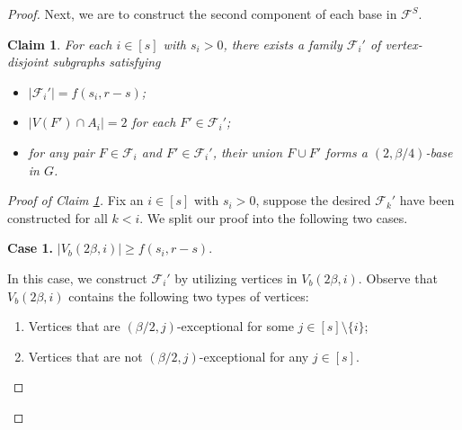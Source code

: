 \documentclass[11pt, a4paper]{article}
\newtheorem{claim}[theorem]{Claim}
\theoremstyle{definition}
\newcommand{\<}{\subseteq}
\begin{document}
\begin{proof}
Next, we are to construct the second component of each base in $\mathcal{F}^S$. 
\begin{claim}\label{com-2}
    For each $i\in [s]$ with $s_i>0$, there exists a family $\mathcal{F}_i'$ of vertex-disjoint subgraphs satisfying
    \begin{itemize}
        \item $|\mathcal{F}_i'|=f(s_i,r-s)$;
        \item $|V(F') \cap A_i|=2$ for each $F'\in \mathcal{F}_i'$;
        \item for any pair  $F\in \mathcal{F}_i$ and 
        $F'\in \mathcal{F}_i'$, their union $F\cup F'$ forms a $(2,\beta/4)$-base in $G$. 
    \end{itemize}
\end{claim}

\begin{proof}[Proof of Claim \ref{com-2}]
Fix an $i\in [s]$ with $s_i>0$,  suppose the desired $\mathcal{F}_k'$ have been constructed for all $k < i$. We split our proof into the following two cases. %



\medskip
\textbf{Case 1.} $|V_b(2\beta,i)|\ge f(s_i,r-s)$.
\medskip

In this case, we construct $\mathcal{F}_i'$ by utilizing vertices in  $V_{b}(2\beta,i)$. Observe that $V_{b}(2\beta, i)$ contains the following two types of vertices:
\begin{enumerate}[label =\rm  {\bf Type \arabic{enumi}}, leftmargin=6em]
    \item\label{v1} Vertices that are $(\beta/2,j)$-exceptional for some $j\in [s]\setminus \{i\}$;
    \item\label{v2} Vertices that are not $(\beta/2,j)$-exceptional for any $j\in[s].$ 
\end{enumerate}



\end{proof}
\end{proof}
\end{document}
